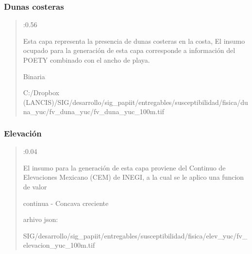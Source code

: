 \documentclass[letterpaper,10pt,spanish]{sphinxmanual}
\begin{document}
\subsubsection{Dunas costeras}
\label{\detokenize{sensibilidad:dunas-costeras}}
\begin{quote}

:0.56


 Esta capa representa la presencia de dunas costeras en la costa, El insumo ocupado
para la generación de esta capa corresponde a información del POETY combinado con
el ancho de playa.

 Binaria

 C:/Dropbox (LANCIS)/SIG/desarrollo/sig\_papiit/entregables/susceptibilidad/fisica/duna\_yuc/fv\_duna\_yuc/fv\_duna\_yuc\_100m.tif


\end{quote}


\subsubsection{Elevación}
\label{\detokenize{sensibilidad:elevacion}}
\begin{quote}

:0.04


 El insumo para la generación de esta capa proviene del Continuo de Elevaciones Mexicano (CEM) de INEGI,
a la cual se le aplico una funcion de valor 

 continua - Concava creciente

arhivo json:


\noindent{}

 SIG/desarrollo/sig\_papiit/entregables/susceptibilidad/fisica/elev\_yuc/fv\_elevacion\_yuc\_100m.tif


\end{quote}
\end{document}
